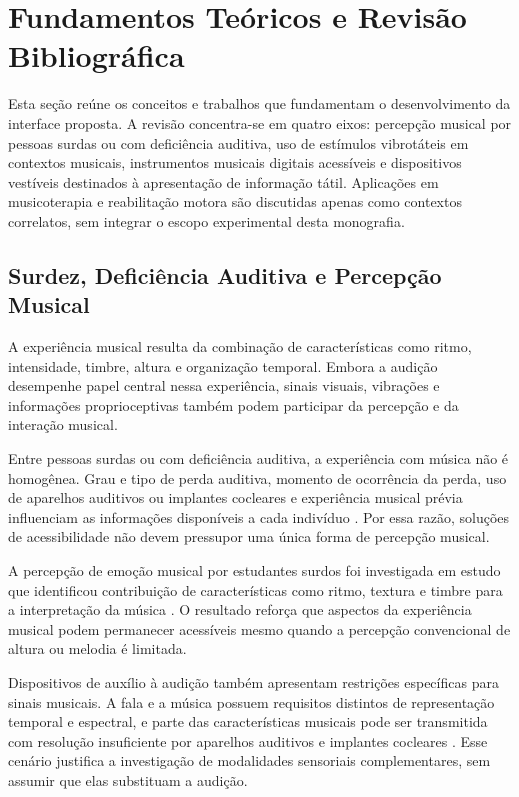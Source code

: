 \chapter[Fundamentos Teóricos e Revisão Bibliográfica]{Fundamentos Teóricos e Revisão \mbox{Bibliográfica}}

Esta seção reúne os conceitos e trabalhos que fundamentam o desenvolvimento da interface proposta. A revisão concentra-se em quatro eixos: percepção musical por pessoas surdas ou com deficiência auditiva, uso de estímulos vibrotáteis em contextos musicais, instrumentos musicais digitais acessíveis e dispositivos vestíveis destinados à apresentação de informação tátil. Aplicações em musicoterapia e reabilitação motora são discutidas apenas como contextos correlatos, sem integrar o escopo experimental desta monografia.

\section{Surdez, Deficiência Auditiva e Percepção Musical}

A experiência musical resulta da combinação de características como ritmo, intensidade, timbre, altura e organização temporal. Embora a audição desempenhe papel central nessa experiência, sinais visuais, vibrações e informações proprioceptivas também podem participar da percepção e da interação musical.

Entre pessoas surdas ou com deficiência auditiva, a experiência com música não é homogênea. Grau e tipo de perda auditiva, momento de ocorrência da perda, uso de aparelhos auditivos ou implantes cocleares e experiência musical prévia influenciam as informações disponíveis a cada indivíduo \cite{fletcher2021}. Por essa razão, soluções de acessibilidade não devem pressupor uma única forma de percepção musical.

A percepção de emoção musical por estudantes surdos foi investigada em estudo que identificou contribuição de características como ritmo, textura e timbre para a interpretação da música \cite{darrow2006}. O resultado reforça que aspectos da experiência musical podem permanecer acessíveis mesmo quando a percepção convencional de altura ou melodia é limitada.

Dispositivos de auxílio à audição também apresentam restrições específicas para sinais musicais. A fala e a música possuem requisitos distintos de representação temporal e espectral, e parte das características musicais pode ser transmitida com resolução insuficiente por aparelhos auditivos e implantes cocleares \cite{fletcher2021}. Esse cenário justifica a investigação de modalidades sensoriais complementares, sem assumir que elas substituam a audição.

